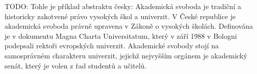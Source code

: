 TODO: Tohle je příklad abstraktu česky:
%
Akademická svoboda je tradiční a historicky zakotvené právo vysokých škol a
univerzit.
%
V České republice je akademická svoboda právně upravena v Zákoně
o vysokých školách.
%
Definována je v dokumentu Magna Charta Universitatum,
který v září 1988 v Bologni podepsali rektoři evropských univerzit.
%
Akademické svobody stojí na samosprávném charakteru univerzit, jejichž
nejvyšším orgánem je akademický senát, který je volen z řad studentů a
učitelů.
